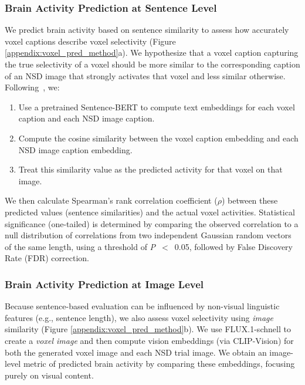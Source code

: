 \subsubsection{Brain Activity Prediction at Sentence Level}
We predict brain activity based on sentence similarity to assess how accurately voxel captions describe voxel selectivity (Figure \ref{appendix:voxel_pred_method}a). We hypothesize that a voxel caption capturing the true selectivity of a voxel should be more similar to the corresponding caption of an NSD image that strongly activates that voxel and less similar otherwise. Following~\cite{singh2023explainingblackboxtext}, we:
\begin{enumerate}
    \item Use a pretrained Sentence-BERT to compute text embeddings for each voxel caption and each NSD image caption.
    \item Compute the cosine similarity between the voxel caption embedding and each NSD image caption embedding.
    \item Treat this similarity value as the predicted activity for that voxel on that image.
\end{enumerate}
We then calculate Spearman’s rank correlation coefficient ($\rho$) between these predicted values (sentence similarities) and the actual voxel activities. Statistical significance (one-tailed) is determined by comparing the observed correlation to a null distribution of correlations from two independent Gaussian random vectors of the same length, using a threshold of \textit{P}~$<$~0.05, followed by False Discovery Rate (FDR) correction.


\subsubsection{Brain Activity Prediction at Image Level}
Because sentence-based evaluation can be influenced by non-visual linguistic features (e.g., sentence length), we also assess voxel selectivity using \textit{image} similarity (Figure \ref{appendix:voxel_pred_method}b). We use FLUX.1-schnell to create a \textit{voxel image} and then compute vision embeddings (via CLIP-Vision) for both the generated voxel image and each NSD trial image. We obtain an image-level metric of predicted brain activity by comparing these embeddings, focusing purely on visual content.